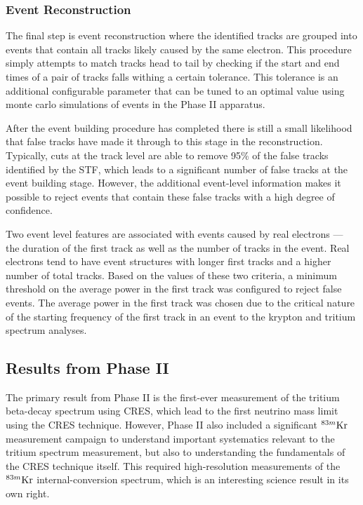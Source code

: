 \subsubsection*{Event Reconstruction}

The final step is event reconstruction where the identified tracks are grouped into events that contain all tracks likely caused by the same electron. This procedure simply attempts to match tracks head to tail by checking if the start and end times of a pair of tracks falls withing a certain tolerance. This tolerance is an additional configurable parameter that can be tuned to an optimal value using monte carlo simulations of events in the Phase II apparatus.

After the event building procedure has completed there is still a small likelihood that false tracks have made it through to this stage in the reconstruction. Typically, cuts at the track level are able to remove 95\% of the false tracks identified by the STF, which leads to a significant number of false tracks at the event building stage. However, the additional event-level information makes it possible to reject events that contain these false tracks with a high degree of confidence. 

Two event level features are associated with events caused by real electrons --- the duration of the first track as well as the number of tracks in the event. Real electrons tend to have event structures with longer first tracks and a higher number of total tracks. Based on the values of these two criteria, a minimum threshold on the average power in the first track was configured to reject false events. The average power in the first track was chosen due to the critical nature of the starting frequency of the first track in an event to the krypton and tritium spectrum analyses.

\subsection{Results from Phase II}

The primary result from Phase II is the first-ever measurement of the tritium beta-decay spectrum using CRES, which lead to the first neutrino mass limit using the CRES technique. However, Phase II also included a significant $^{83m}\rm{Kr}$ measurement campaign to understand important systematics relevant to the tritium spectrum measurement, but also to understanding the fundamentals of the CRES technique itself. This required high-resolution measurements of the $^{83m}\rm{Kr}$ internal-conversion spectrum, which is an interesting science result in its own right.

